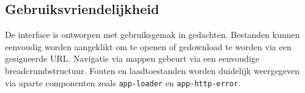 \subsection{Gebruiksvriendelijkheid}

De interface is ontworpen met gebruiksgemak in gedachten. Bestanden kunnen eenvoudig worden aangeklikt om te openen of gedownload te worden via een gesigneerde URL. Navigatie via mappen gebeurt via een eenvoudige breadcrumbstructuur. Fouten en laadtoestanden worden duidelijk weergegeven via aparte componenten zoals \texttt{app-loader} en \texttt{app-http-error}.
